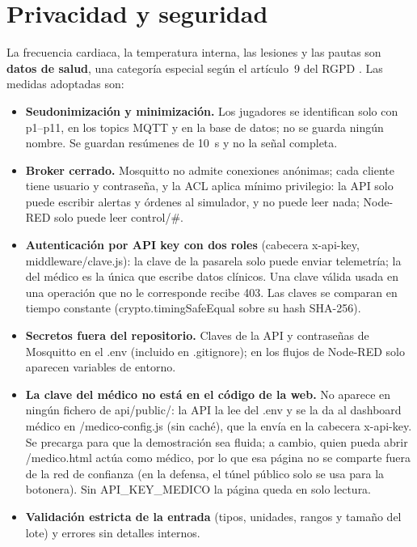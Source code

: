 \documentclass[runningheads]{llncs}
\begin{document}
\section{Privacidad y seguridad}\label{sec:seguridad}

La frecuencia cardiaca, la temperatura interna, las lesiones y las pautas son \textbf{datos de salud}, una categoría especial según el artículo~9 del RGPD \cite{rgpd}. Las medidas adoptadas son:

\begin{itemize}
  \item \textbf{Seudonimización y minimización.} Los jugadores se identifican solo con p1--p11, en los topics MQTT y en la base de datos; no se guarda ningún nombre. Se guardan resúmenes de 10~s y no la señal completa.
  \item \textbf{Broker cerrado.} Mosquitto no admite conexiones anónimas; cada cliente tiene usuario y contraseña, y la ACL aplica mínimo privilegio: la API solo puede escribir alertas y órdenes al simulador, y no puede leer nada; Node-RED solo puede leer control/\#.
  \item \textbf{Autenticación por API key con dos roles} (cabecera x-api-key, middleware/clave.js): la clave de la pasarela solo puede enviar telemetría; la del médico es la única que escribe datos clínicos. Una clave válida usada en una operación que no le corresponde recibe 403. Las claves se comparan en tiempo constante (crypto.timingSafeEqual sobre su hash SHA-256).
  \item \textbf{Secretos fuera del repositorio.} Claves de la API y contraseñas de Mosquitto en el .env (incluido en .gitignore); en los flujos de Node-RED solo aparecen variables de entorno.
  \item \textbf{La clave del médico no está en el código de la web.} No aparece en ningún fichero de api/public/: la API la lee del .env y se la da al dashboard médico en /medico-config.js (sin caché), que la envía en la cabecera x-api-key. Se precarga para que la demostración sea fluida; a cambio, quien pueda abrir /medico.html actúa como médico, por lo que esa página no se comparte fuera de la red de confianza (en la defensa, el túnel público solo se usa para la botonera). Sin API\_KEY\_MEDICO la página queda en solo lectura.
  \item \textbf{Validación estricta de la entrada} (tipos, unidades, rangos y tamaño del lote) y errores sin detalles internos.
\end{itemize}
\end{document}
